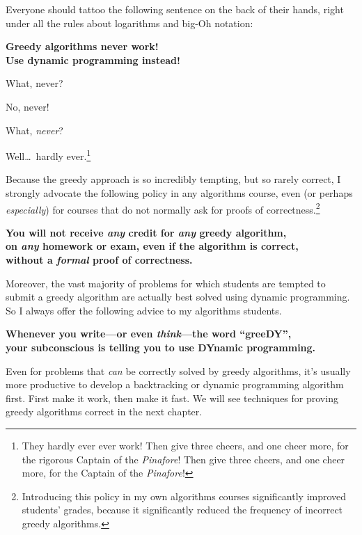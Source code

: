 Everyone should tattoo the following sentence on the back of their hands, right under all the rules about logarithms and big-Oh notation:
\begin{problembox}
{\centering\color{JEred}\sffamily\bfseries{\LARGE Greedy algorithms never work!}\\ \large Use dynamic programming instead!\par}
\end{problembox}

What, never?

No, never!

What, \textit{never}?

Well\dots\ hardly ever.\footnote{They hardly ever ever work! Then give three cheers, and one cheer more, for the rigorous Captain of the \textit{Pinafore}! Then give three cheers, and one cheer more, for the Captain of the \textit{Pinafore}!}

Because the greedy approach is so incredibly tempting, but so rarely correct, I strongly advocate the following policy in any algorithms course, even (or perhaps \textit{especially}) for courses that do not normally ask for proofs of correctness.\footnote{Introducing this policy in my own algorithms courses significantly improved students’ grades, because it significantly reduced the frequency of incorrect greedy algorithms.}
\begin{center}
\textbf{You will not receive \textit{any} credit for \textit{any} greedy algorithm,\\ on \textit{any} homework or exam, even if the algorithm is correct,\\ without a \textit{formal} proof of correctness.}
\end{center}
Moreover, the vast majority of problems for which students are tempted to submit a greedy algorithm are actually best solved using dynamic programming.
So I always offer the following advice to my algorithms students.
\begin{center}
\textbf{Whenever you write---or even \textit{think}---the word “greeDY”,\\ your subconscious is telling you to use DYnamic programming.}
\end{center}
Even for problems that \textit{can} be correctly solved by greedy algorithms, it’s usually more productive to develop a backtracking or dynamic programming algorithm first.
First make it work, then make it fast.
We will see techniques for proving greedy algorithms correct in the next chapter.

